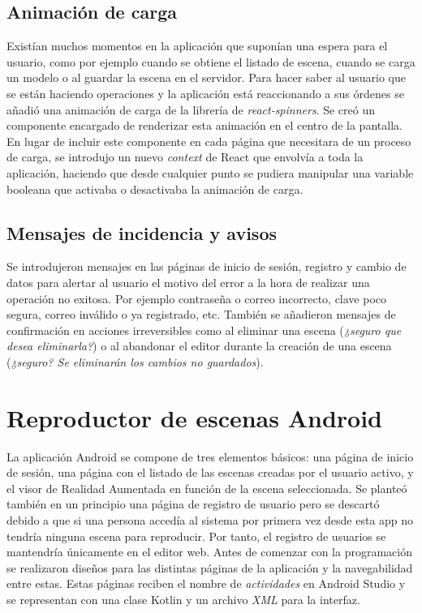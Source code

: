 \subsection{Animación de carga}

Existían muchos momentos en la aplicación que suponían una espera para el usuario, como por ejemplo cuando se obtiene el listado de escena, cuando se carga un modelo o al guardar la escena en el servidor. Para hacer saber al usuario que se están haciendo operaciones y la aplicación está reaccionando a sus órdenes se añadió una animación de carga de la librería de \textit{react-spinners}\cite{reactspinners}. Se creó un componente encargado de renderizar esta animación en el centro de la pantalla. En lugar de incluir este componente en cada página que necesitara de un proceso de carga, se introdujo un nuevo \textit{context} de React que envolvía a toda la aplicación, haciendo que desde cualquier punto se pudiera manipular una variable booleana que activaba o desactivaba la animación de carga.

\subsection{Mensajes de incidencia y avisos}

Se introdujeron mensajes en las páginas de inicio de sesión, registro y cambio de datos para alertar al usuario el motivo del error a la hora de realizar una operación no exitosa. Por ejemplo contraseña o correo incorrecto, clave poco segura, correo inválido o ya registrado, etc. También se añadieron mensajes de confirmación en acciones irreversibles como al eliminar una escena (\textit{¿seguro que desea eliminarla?}) o al abandonar el editor durante la creación de una escena (\textit{¿seguro? Se eliminarán los cambios no guardados}).

\section{Reproductor de escenas Android}

La aplicación Android se compone de tres elementos básicos: una página de inicio de sesión, una página con el listado de las escenas creadas por el usuario activo, y el visor de Realidad Aumentada en función de la escena seleccionada. Se planteó también en un principio una página de registro de usuario pero se descartó debido a que si una persona accedía al sistema por primera vez desde esta app no tendría ninguna escena para reproducir. Por tanto, el registro de usuarios se mantendría únicamente en el editor web. Antes de comenzar con la programación se realizaron diseños para las distintas páginas de la aplicación y la navegabilidad entre estas. Estas páginas reciben el nombre de \textit{actividades} en Android Studio y se representan con una clase Kotlin y un archivo \textit{XML} para la interfaz.

